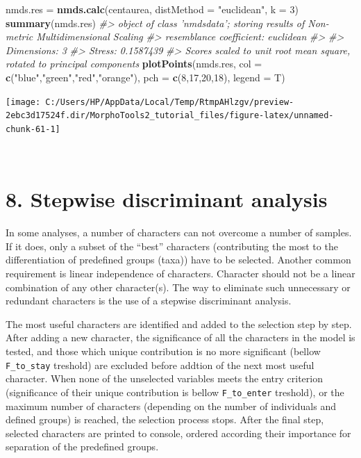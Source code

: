 \documentclass[
]{article}
\newenvironment{Shaded}{\begin{snugshade}}{\end{snugshade}}
\newcommand{\CommentTok}[1]{\textcolor[rgb]{0.56,0.35,0.01}{\textit{#1}}}
\newcommand{\DataTypeTok}[1]{\textcolor[rgb]{0.13,0.29,0.53}{#1}}
\newcommand{\DecValTok}[1]{\textcolor[rgb]{0.00,0.00,0.81}{#1}}
\newcommand{\KeywordTok}[1]{\textcolor[rgb]{0.13,0.29,0.53}{\textbf{#1}}}
\newcommand{\NormalTok}[1]{#1}
\newcommand{\StringTok}[1]{\textcolor[rgb]{0.31,0.60,0.02}{#1}}
\begin{document}
\begin{Shaded}
\begin{Highlighting}[]
\NormalTok{nmds.res =}\StringTok{ }\KeywordTok{nmds.calc}\NormalTok{(centaurea, }\DataTypeTok{distMethod =} \StringTok{"euclidean"}\NormalTok{, }\DataTypeTok{k =} \DecValTok{3}\NormalTok{)}
\KeywordTok{summary}\NormalTok{(nmds.res)}
\CommentTok{#> object of class 'nmdsdata'; storing results of Non-metric Multidimensional Scaling}
\CommentTok{#> resemblance coefficient:  euclidean }
\CommentTok{#> }
\CommentTok{#> Dimensions:  3}
\CommentTok{#> Stress:  0.1587439}
\CommentTok{#> Scores scaled to unit root mean square, rotated to principal components}
\KeywordTok{plotPoints}\NormalTok{(nmds.res, }\DataTypeTok{col =} \KeywordTok{c}\NormalTok{(}\StringTok{"blue"}\NormalTok{,}\StringTok{"green"}\NormalTok{,}\StringTok{"red"}\NormalTok{,}\StringTok{"orange"}\NormalTok{), }\DataTypeTok{pch =} \KeywordTok{c}\NormalTok{(}\DecValTok{8}\NormalTok{,}\DecValTok{17}\NormalTok{,}\DecValTok{20}\NormalTok{,}\DecValTok{18}\NormalTok{), }
            \DataTypeTok{legend =}\NormalTok{ T)}
\end{Highlighting}
\end{Shaded}

\begin{center}\texttt{[image: C:/Users/HP/AppData/Local/Temp/RtmpAHlzgv/preview-2ebc3d17524f.dir/MorphoTools2\_tutorial\_files/figure-latex/unnamed-chunk-61-1]} \end{center}

~

\hypertarget{stepwise-discriminant-analysis}{%
\section{8. Stepwise discriminant
analysis}\label{stepwise-discriminant-analysis}}

In some analyses, a number of characters can not overcome a number of
samples. If it does, only a subset of the ``best'' characters
(contributing the most to the differentiation of predefined groups
(taxa)) have to be selected. Another common requirement is linear
independence of characters. Character should not be a linear combination
of any other character(s). The way to eliminate such unnecessary or
redundant characters is the use of a stepwise discriminant analysis.

The most useful characters are identified and added to the selection
step by step. After adding a new character, the significance of all the
characters in the model is tested, and those which unique contribution
is no more significant (bellow \texttt{F\_to\_stay} treshold) are
excluded before addtion of the next most useful character. When none of
the unselected variables meets the entry criterion (significance of
their unique contribution is bellow \texttt{F\_to\_enter} treshold), or
the maximum number of characters (depending on the number of individuals
and defined groups) is reached, the selection process stops. After the
final step, selected characters are printed to console, ordered
according their importance for separation of the predefined groups.
\end{document}
